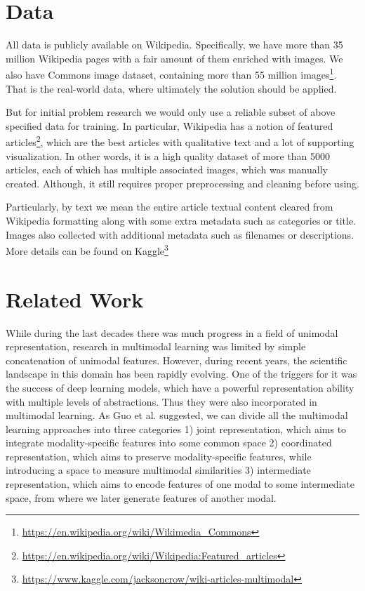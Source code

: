 \documentclass[runningheads]{llncs}
\begin{document}
\section{Data}
All data is publicly available on Wikipedia. Specifically, we have more than 35 million Wikipedia pages with a fair amount of them enriched with images. We also have Commons image dataset\cite{ref_wiki_commons}, containing more than 55 million images\footnote{\url{https://en.wikipedia.org/wiki/Wikimedia_Commons}}. That is the real-world data, where ultimately the solution should be applied.

But for initial problem research we would only use a reliable subset of above specified data for training. In particular, Wikipedia has a notion of featured articles\footnote{\url{https://en.wikipedia.org/wiki/Wikipedia:Featured_articles}}, which are the best articles with qualitative text and a lot of supporting visualization. In other words, it is a high quality dataset of more than 5000 articles, each of which has multiple associated images, which was manually created. Although, it still requires proper preprocessing and cleaning before using.

Particularly, by text we mean the entire article textual content cleared from Wikipedia formatting along with some extra metadata such as categories or title. Images also collected with additional metadata such as filenames or descriptions. More details can be found on Kaggle\footnote{\url{https://www.kaggle.com/jacksoncrow/wiki-articles-multimodal}}


\section{Related Work}
While during the last decades there was much progress in a field of unimodal representation, research in multimodal learning was limited by simple concatenation of unimodal features\cite{ref_survey_2015}. However, during recent years, the scientific landscape in this domain has been rapidly evolving\cite{ref_survey_baltrusaitis}. One of the triggers for it was the success of deep learning models, which have a powerful representation ability with multiple levels of abstractions. Thus they were also incorporated in multimodal learning. As Guo et al. suggested\cite{ref_survey}, we can divide all the multimodal learning approaches into three categories 1) joint representation, which aims to integrate modality-specific features into some common space 2) coordinated representation, which aims to preserve modality-specific features, while introducing a space to measure multimodal similarities  3) intermediate representation, which aims to encode features of one modal to some intermediate space, from where we later generate features of another modal.
\end{document}

